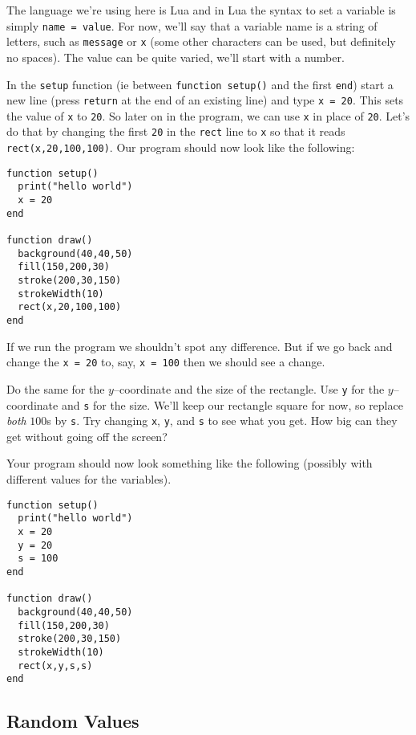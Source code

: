 \documentclass[
  xhtml,%
  use filename%
]{internet}
\begin{document}
The language we're using here is Lua and in Lua the syntax to set a variable is simply \verb+name = value+.
For now, we'll say that a variable name is a string of letters, such as \verb+message+ or \verb+x+ (some other characters can be used, but definitely no spaces).
The value can be quite varied, we'll start with a number.

In the \verb+setup+ function (ie between \verb+function setup()+ and the first \verb+end+) start a new line (press \verb+return+ at the end of an existing line) and type \verb+x = 20+.
This sets the value of \verb+x+ to \verb+20+.
So later on in the program, we can use \verb+x+ in place of \verb+20+.
Let's do that by changing the first \verb+20+ in the \verb+rect+ line to \verb+x+ so that it reads \verb+rect(x,20,100,100)+.
Our program should now look like the following:

\begin{verbatim}
function setup()
  print("hello world")
  x = 20
end

function draw()
  background(40,40,50)
  fill(150,200,30)
  stroke(200,30,150)
  strokeWidth(10)
  rect(x,20,100,100)
end
\end{verbatim}


If we run the program we shouldn't spot any difference.
But if we go back and change the \verb+x = 20+ to, say, \verb+x = 100+ then we should see a change.

Do the same for the \(y\)--coordinate and the size of the rectangle.
Use \verb+y+ for the \(y\)--coordinate and \verb+s+ for the size.
We'll keep our rectangle square for now, so replace \emph{both} \(100\)s by \verb+s+.
Try changing \verb+x+, \verb+y+, and \verb+s+ to see what you get.
How big can they get without going off the screen?

Your program should now look something like the following (possibly with different values for the variables).

\begin{verbatim}
function setup()
  print("hello world")
  x = 20
  y = 20
  s = 100
end

function draw()
  background(40,40,50)
  fill(150,200,30)
  stroke(200,30,150)
  strokeWidth(10)
  rect(x,y,s,s)
end
\end{verbatim}

\subsection{Random Values}
\end{document}
